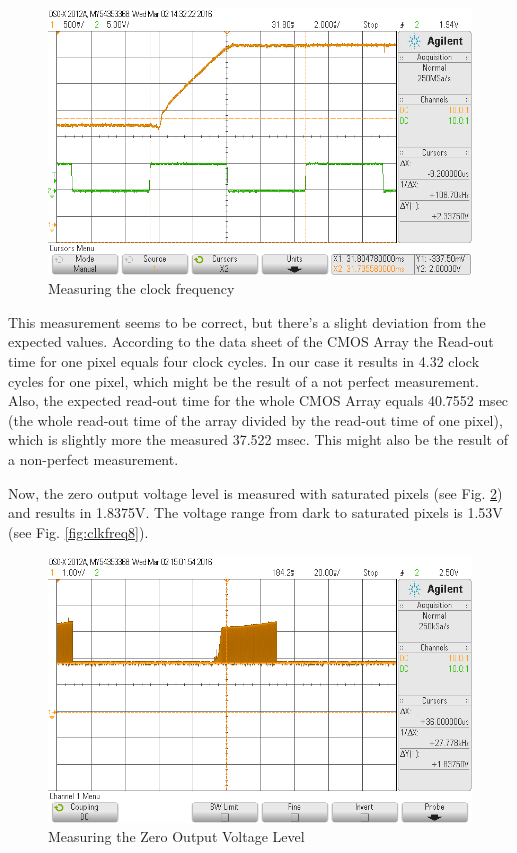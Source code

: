 \begin{figure}[H]
\begin{center}
\includegraphics[scale=0.4]{LabFour/scope_59}
\end{center}
\caption{Measuring the clock frequency}
\label{fig:clkfreq6}
\end{figure}

This measurement seems to be correct, but there's a slight deviation from the expected values. According to the data sheet of the CMOS Array the Read-out time for one pixel equals four clock cycles. In our case it results in 4.32 clock cycles for one pixel, which might be the result of a not perfect measurement.\\
Also, the expected read-out time for the whole CMOS Array equals 40.7552 msec (the whole read-out time of the array divided by the read-out time of one pixel), which is slightly more the measured 37.522 msec. This might also be the result of a non-perfect measurement.

Now, the zero output voltage level is measured with saturated pixels (see Fig. \ref{fig:clkfreq7}) and results in 1.8375V.
The voltage range from dark to saturated pixels is 1.53V (see Fig. \ref{fig:clkfreq8}).


\begin{figure}[H]
\begin{center}
\includegraphics[scale=0.4]{LabFour/scope_63}
\end{center}
\caption{Measuring the Zero Output Voltage Level}
\label{fig:clkfreq7}
\end{figure}

